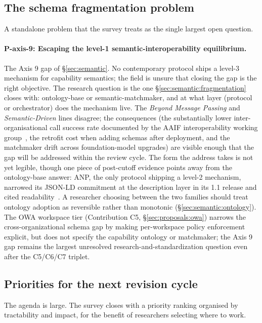 \subsection{The schema fragmentation problem}
\label{sec:openproblems:schema}

A standalone problem that the survey treats as the
single largest open question.

\paragraph{P-axis-9: Escaping the level-1
semantic-interoperability equilibrium.}
The Axis 9 gap of \S\ref{sec:semantic}. No
contemporary protocol ships a level-3 mechanism
for capability semantics; the field is unsure
that closing the gap is the right objective. The
research question is the one
\S\ref{sec:semantic:fragmentation} closes with:
ontology-base or semantic-matchmaker, and at
what layer (protocol or orchestrator) does the
mechanism live. The
\emph{Beyond Message Passing} and
\emph{Semantic-Driven} lines disagree; the
consequences (the substantially lower
inter-organisational call success rate
documented by the AAIF interoperability working
group~\cite{lf_aaif}, the retrofit cost when
adding schemas after deployment, and the
matchmaker drift across foundation-model
upgrades) are visible enough that the gap will
be addressed within the review cycle. The form
the address takes is not yet legible, though one piece of
post-cutoff evidence points away from the ontology-base
answer: ANP, the only protocol shipping a level-2
mechanism, narrowed its JSON-LD commitment at the
description layer in its 1.1 release and cited
readability~\cite{spec_anp_v11}. A researcher choosing
between the two families should treat ontology adoption as
reversible rather than monotonic
(\S\ref{sec:semantic:ontology}). The OWA workspace tier
(Contribution C5, \S\ref{sec:proposals:owa})
narrows the cross-organizational schema gap by
making per-workspace policy enforcement
explicit, but does not specify the capability
ontology or matchmaker; the Axis 9 gap remains
the largest unresolved research-and-standardization
question even after the C5/C6/C7 triplet.

\subsection{Priorities for the next revision cycle}
\label{sec:openproblems:priorities}

The agenda is large. The survey closes with a
priority ranking organised by tractability and
impact, for the benefit of researchers selecting
where to work.

